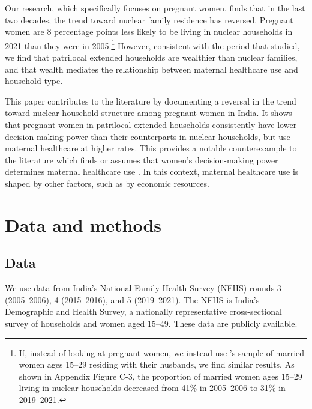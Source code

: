\documentclass[10pt,twoside,reqno]{article}
\begin{document}
Our research, which specifically focuses on pregnant women, finds that in the last two decades, the trend toward nuclear family residence has reversed. Pregnant women are 8 percentage points less likely to be living in nuclear households in 2021 than they were in 2005.\footnote{If, instead of looking at pregnant women, we instead use \cite{allendorf2013going}'s sample of married women ages 15--29 residing with their husbands, we find similar results.  As shown in Appendix Figure C-3, the proportion of married women ages 15--29 living in nuclear households decreased from 41\% in 2005--2006 to 31\% in 2019--2021.}  However, consistent with the period that \cite{allendorf2013going} studied, we find that patrilocal extended households are wealthier than nuclear families, and that wealth mediates the relationship between maternal healthcare use and household type. 

This paper contributes to the literature by documenting a reversal in the trend toward nuclear household structure among pregnant women in India. It shows that pregnant women in patrilocal extended households consistently have lower decision-making power than their counterparts in nuclear households, but use maternal healthcare at higher rates. This provides a notable counterexample to the literature which finds or assumes that women's decision-making power determines maternal healthcare use \citep{majumder2024does,mistry2009women}.  In this context, maternal healthcare use is shaped by other factors, such as by economic resources.

\section*{Data and methods}\label{sec:data_and_methods} %

\subsection*{Data} \label{sec:data}

We use data from India’s National Family Health Survey (NFHS) rounds 3 (2005–2006), 4 (2015–2016), and 5 (2019–2021). The NFHS is India’s Demographic and Health Survey, a nationally representative cross-sectional survey of households and women aged 15–49. These data are publicly available.
\end{document}
